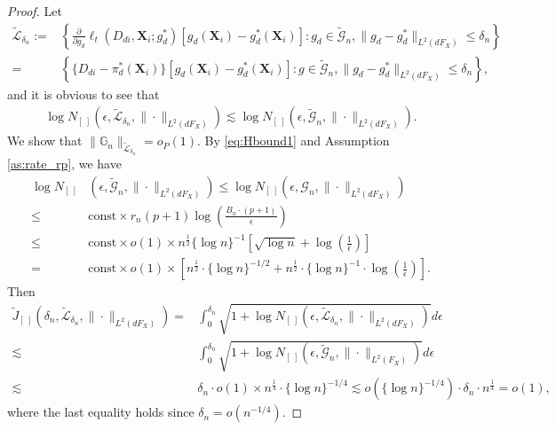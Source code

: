 \documentclass[11pt]{article}
\def\bs{\boldsymbol}
\numberwithin{equation}{section}
\begin{document}
\begin{proof}
	Let
	\begin{align*}
		\widetilde{\mathcal{L}}_{\delta_n}:=&\left\{\frac{\partial}{\partial g_d}\ell_t(D_{di},\boldsymbol{X}_i;g_d^*)[ g_d(\boldsymbol{X}_{i})-g_d^*(\boldsymbol{X}_{i})]:g_d\in\widetilde{\mathcal{G}}_n,\|g_d-g_d^*\|_{L^2(dF_X)}\leq \delta_n \right\}\\
		=&\left\{\{D_{di}-\pi_d^*(\bs{X}_i)\}[g_d(\boldsymbol{X}_i)-g_d^*(\boldsymbol{X}_i)]:g\in\widetilde{\mathcal{G}}_n,\|g_d-g_d^*\|_{L^2(dF_X)}\leq \delta_n \right\},
	\end{align*}	
	and it is obvious to see that
	\begin{align*}
		\log N_{[\ ]}(\epsilon,\widetilde{\mathcal{L}}_{\delta_n},\|\cdot\|_{L^2(dF_{X})}) \lesssim 	\log N_{[\ ]}(\epsilon,\widetilde{\mathcal{G}}_{n},\|\cdot\|_{L^2(dF_{X})}).
	\end{align*}
	We show that $\|\mathbb{G}_n\|_{\widetilde{\mathcal{L}}_{\delta_n}}=o_P(1)$.	By \eqref{eq:Hbound1} and Assumption \ref{as:rate_rp}, we have
	\begin{align*}
		\log N_{[\ ]}&(\epsilon,\widetilde{\mathcal{G}}_n,\|\cdot\|_{L^2(dF_{X})})\leq  \log N_{[\  ]}(\epsilon,\mathcal{G}_n,\|\cdot\|_{L^2(dF_{X})})\\
		\leq & \text{const}\times r_n(p+1)\log \left(\frac{B_n\cdot(p+1)}{\epsilon}\right)\\
		\leq &\text{const} \times o(1)\times n^{\frac{1}{2}}\{\log n\}^{-1}\left[\sqrt{\log n} +\log \left(\frac{1}{\epsilon}\right)\right]\\
		=&\text{const}\times o(1)\times \left[ n^{\frac{1}{2}}\cdot \{\log n \}^{-1/2}+n^{\frac{1}{2}}\cdot\{\log n\}^{-1}\cdot\log \left(\frac{1}{\epsilon}\right)\right].
	\end{align*}	
	Then
	\begin{align*}
		\widetilde{J}_{[\ ]}(\delta_n,\widetilde{\mathcal{L}}_{\delta_n},\|\cdot\|_{L^2(dF_{X})})	=&\int_0^{\delta_n}\sqrt{1+\log N_{[\ ]}(\epsilon,\widetilde{\mathcal{L}}_{\delta_n},\|\cdot\|_{L^2(dF_{X})})}d\epsilon\\
		\lesssim&\int_0^{\delta_n}\sqrt{1+\log N_{[\ ]}(\epsilon,\widetilde{\mathcal{G}}_{n},\|\cdot\|_{L^2(F_{X})})}d\epsilon\\
		\lesssim&\delta_n\cdot o(1)\times   n^{\frac{1}{4}}\cdot \{\log n \}^{-1/4}
		\lesssim   o\left(\{\log n \}^{-1/4}\right)\cdot \delta_n\cdot n^{\frac{1}{4}}=o\left(1\right),
	\end{align*}
	where the last equality holds since $\delta_n=o(n^{-1/4})$.

\end{proof}
\end{document}
